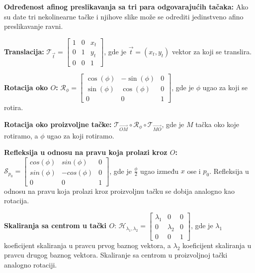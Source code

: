 \documentclass[12pt]{article}
\newcommand{\vek}[1]{\overrightarrow{#1}}
\begin{document}
\textbf{Određenost afinog preslikavanja sa tri para odgovarajućih tačaka:}
Ako su date tri nekolinearne tačke i njihove slike može se odrediti jedinstveno
afino preslikavanje ravni.
\par

\textbf{Translacija:}
$\mathcal{T}_{\vek{t}}=\begin{bmatrix}
        1 & 0 & x_t \\
        0 & 1 & y_t \\
        0 & 0 & 1
    \end{bmatrix}$, gde je $\vek{t}=(x_t,y_t)$ vektor za koji se translira.
\par

\textbf{Rotacija oko $O$:}
$\mathcal{R}_\phi=\begin{bmatrix}
        \cos(\phi) & -\sin(\phi) & 0 \\
        \sin(\phi) & \cos(\phi)  & 0 \\
        0          & 0           & 1
    \end{bmatrix}$, gde je $\phi$ ugao za koji se rotira.
\par

\textbf{Rotacija oko proizvoljne tačke:}
$\mathcal{T}_{\vek{OM}}\circ\mathcal{R}_\phi\circ\mathcal{T}_{\vek{MO}}$, gde
je $M$ tačka oko koje rotiramo, a $\phi$ ugao za koji rotiramo.
\par

\textbf{Refleksija u odnosu na pravu koja prolazi kroz $O$:}
$\mathcal{S}_{p_0}=\begin{bmatrix}
        cos(\phi) & sin(\phi)  & 0 \\
        sin(\phi) & -cos(\phi) & 0 \\
        0         & 0          & 1
    \end{bmatrix}$, gde je $\frac{\phi}{2}$ ugao između $x$ ose i $p_0$.
Refleksija u odnosu na pravu koja prolazi kroz proizvoljnu tačku se dobija
analogno kao rotacija.
\par

\textbf{Skaliranja sa centrom u tački $O$}:
$\mathcal{H}_{\lambda_1,\lambda_2}=\begin{bmatrix}
        \lambda_1 & 0         & 0 \\
        0         & \lambda_2 & 0 \\
        0         & 0         & 1
    \end{bmatrix}$, gde je $\lambda_1$ koeficijent skaliranja u pravcu
prvog baznog vektora, a $\lambda_2$ koeficijent skaliranja u pravcu
drugog baznog vektora. Skaliranje sa centrom u proizvoljnoj tački analogno
rotaciji.
\par
\end{document}
